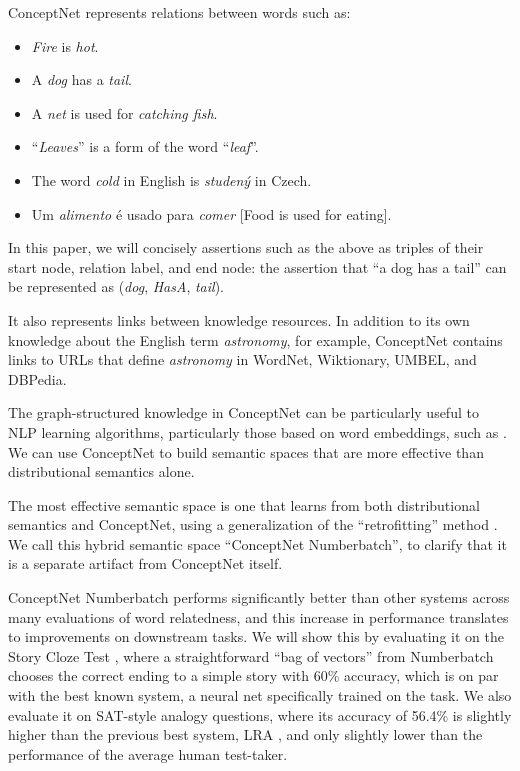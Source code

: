 \documentclass[letterpaper]{article}
\begin{document}
ConceptNet represents relations between words such as:

\begin{itemize}
    \item \emph{Fire} is \emph{hot}.
    \item A \emph{dog} has a \emph{tail}.
    \item A \emph{net} is used for \emph{catching fish}.
    \item ``\emph{Leaves}'' is a form of the word ``\emph{leaf}''.
    \item The word \emph{cold} in English is \emph{studený} in Czech.
    \item Um \emph{alimento} é usado para \emph{comer} [Food is used for eating].
\end{itemize}

In this paper, we will concisely assertions such as the above as triples of
their start node, relation label, and end node: the assertion that ``a dog has
a tail'' can be represented as (\emph{dog}, \emph{HasA}, \emph{tail}).

It also represents links between knowledge resources. In addition to its own
knowledge about the English term \emph{astronomy}, for example, ConceptNet
contains links to URLs that define \emph{astronomy} in WordNet, Wiktionary,
UMBEL, and DBPedia.

The graph-structured knowledge in ConceptNet can be particularly useful to NLP
learning algorithms, particularly those based on word embeddings, such as
\cite{mikolov2013word2vec}. We can use ConceptNet to build semantic spaces that
are more effective than distributional semantics alone.

The most effective semantic space is one that learns from both distributional
semantics and ConceptNet, using a generalization of the ``retrofitting'' method
\cite{faruqui2015retrofitting}. We call this hybrid semantic space ``ConceptNet
Numberbatch'', to clarify that it is a separate artifact from ConceptNet
itself.

ConceptNet Numberbatch performs significantly better than other systems across
many evaluations of word relatedness, and this increase in performance
translates to improvements on downstream tasks. We will show this by evaluating
it on the Story Cloze Test \cite{mostafazadeh2016cloze}, where a
straightforward ``bag of vectors'' from Numberbatch chooses the correct ending
to a simple story with 60\% accuracy, which is on par with the best known
system, a neural net specifically trained on the task. We also evaluate it on
SAT-style analogy questions, where its accuracy of 56.4\% is slightly higher
than the previous best system, LRA \cite{turney2005lra}, and only slightly
lower than the performance of the average human test-taker.
\end{document}
